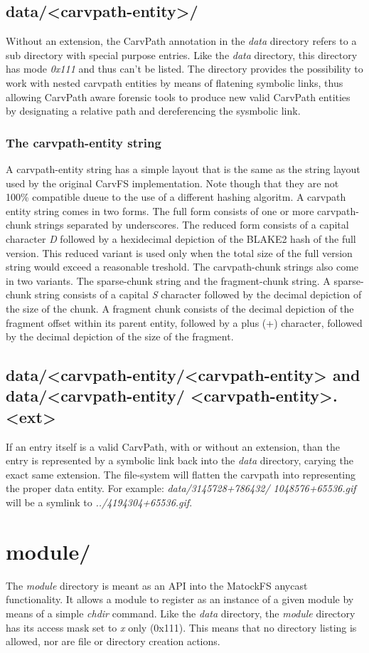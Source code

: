 \subsection{data/<carvpath-entity>/}
Without an extension, the CarvPath annotation in the \emph{data} directory refers to a sub directory with special purpose entries. Like the \emph{data} directory, this directory has mode \emph{0x111} and thus can't be listed. The directory provides the possibility to work with nested carvpath entities by means of flatening symbolic links, thus allowing CarvPath aware forensic tools to produce new valid CarvPath entities by designating a relative path and dereferencing the sysmbolic link.
\subsubsection{The carvpath-entity string}
A carvpath-entity string has a simple layout that is the same as the string layout used by the original CarvFS implementation. Note though that they are not 100\% compatible dueue to the use of a different hashing algoritm. A carvpath entity string comes in two forms. The full form consists of one or more carvpath-chunk strings separated by underscores. The reduced form consists of a capital character \emph{D} followed by a hexidecimal depiction of the BLAKE2 hash of the full version. This reduced variant is used only when the total size of the full version string would exceed a reasonable treshold. The carvpath-chunk strings also come in two variants. The sparse-chunk string and the fragment-chunk string. A sparse-chunk string consists of a capital \emph{S} character followed by the decimal depiction of the size of the chunk. A fragment chunk consists of the decimal depiction of the fragment offset within its parent entity, followed by a plus (+) character, followed by the decimal depiction of the size of the fragment.
\subsection{data/<carvpath-entity/<carvpath-entity> and data/<carvpath-entity/ <carvpath-entity>.<ext>}
If an entry itself is a valid CarvPath, with or without an extension, than the entry is represented by a symbolic link back into the \emph{data} directory, carying the exact same extension. The file-system will flatten the carvpath into representing the proper data entity. For example: \emph{data/3145728+786432/ 1048576+65536.gif} will be a symlink to \emph{../4194304+65536.gif}.
\section{module/}
The \emph{module} directory is meant as an API into the MatockFS anycast functionality. It allows a module to register as an instance of a given module by means of a simple \emph{chdir} command. Like the \emph{data} directory, the \emph{module} directory has its access mask set to \emph{x} only (0x111). This means that no directory listing is allowed, nor are file or directory creation actions.  
